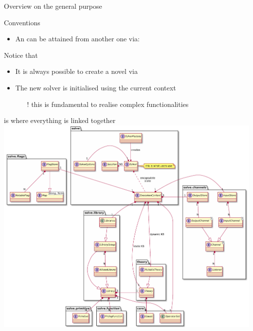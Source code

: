 \documentclass[handout]{beamer}
\begin{document}
\begin{frame}[allowframebreaks]{Overview on the general purpose }
\begin{alertblock}{Conventions}
\begin{itemize}
            \item An  can be attained from another one via:
        \end{itemize}
    \end{alertblock}

    \framebreak

    \begin{exampleblock}{Notice that}
        \begin{itemize}
            \item It is always possible to create a novel  via

            \item The new solver is initialised using the current context
            \begin{itemize}
                \item[!] this is fundamental to realise complex functionalities
            \end{itemize}
        \end{itemize}
    \end{exampleblock}
\end{frame}

\begin{frame}{ is where everything is linked together}
    \centering
    \includegraphics[width=.75\linewidth]{img/solve.pdf}
\end{frame}
\end{document}
